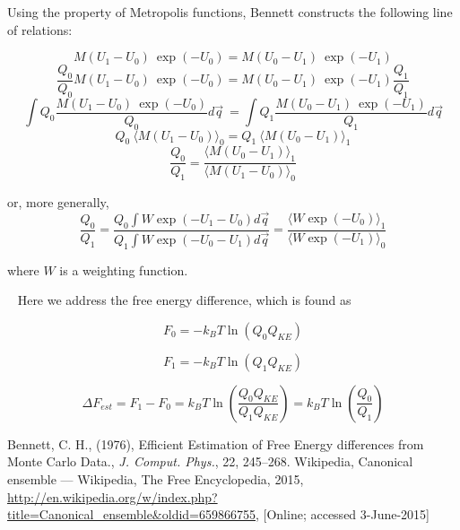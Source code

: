 \documentclass[]{article}
\begin{document}
Using the property of Metropolis functions, Bennett constructs the following line of relations\cite{bennett}:

\[ M(U_1 - U_0)~\exp(-U_0) = M(U_0 - U_1)~\exp(-U_1) \]
\[ \frac{Q_0}{Q_0} M(U_1 - U_0)~\exp(-U_0) = M(U_0 - U_1)~\exp(-U_1) \frac{Q_1}{Q_1} \]
\[ \int Q_0  \frac{M(U_1 - U_0)~\exp(-U_0)}{Q_0} d\vec{q} ~ = \int Q_1 \frac{M(U_0 - U_1)~\exp(-U_1)}{Q_1} d\vec{q} \]
\[ Q_0~\langle M(U_1 - U_0) \rangle_0 = Q_1~\langle M(U_0 - U_1) \rangle_1 \]
\[ \frac{Q_0}{Q_1} = \frac{\langle M(U_0 - U_1) \rangle_1}{\langle M(U_1 - U_0) \rangle_0} \]

or, more generally,
\[ \frac{Q_0}{Q_1} = \frac{Q_0 \int W \exp(-U_1 - U_0) d\vec{q}}{Q_1 \int W \exp(-U_0 - U_1) d\vec{q}} = \frac{\langle W \exp(-U_0) \rangle_1}{\langle W \exp(-U_1) \rangle_0} \]

where $W$ is a weighting function.

~\linebreak
Here we address the free energy difference, which is found as

\begin{minipage}[b]{0.45\linewidth}
	\[ F_0 = -k_B T \ln(Q_0 Q_{KE} ) \]
\end{minipage}
\hfill
\begin{minipage}[b]{0.45\linewidth}
	\[ F_1 = -k_B T \ln(Q_1 Q_{KE} ) \]
\end{minipage}

\[ \Delta F_{est} = F_1 - F_0 = k_B T \ln \left( \frac{Q_0 Q_{KE}}{Q_1 Q_{KE}} \right) = k_B T \ln \left( \frac{Q_0}{Q_1} \right) \]

\begin{thebibliography}{9}
		Bennett, C. H.,
		(1976),
		Efficient Estimation of Free Energy differences from Monte Carlo Data.,
		\emph{J. Comput. Phys.},
		22, 
		245–268.
		Wikipedia,
		Canonical ensemble --- Wikipedia{,} The Free Encyclopedia,
		2015,
		\url{http://en.wikipedia.org/w/index.php?title=Canonical_ensemble&oldid=659866755},
		[Online; accessed 3-June-2015]
\end{thebibliography}
\end{document}
